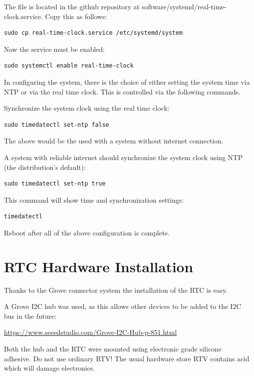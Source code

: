 The file is located in the github repository at software/systemd/real-time-clock.service.
Copy this as follows:

\begin{verbatim}
sudo cp real-time-clock.service /etc/systemd/system
\end{verbatim}

Now the service must be enabled:

\begin{verbatim}
sudo systemctl enable real-time-clock
\end{verbatim}

In configuring the system, there is the choice of either setting the system time via NTP or via the real time clock.  This is controlled via the following commands.

Synchronize the system clock using the real time clock:

\begin{verbatim}
sudo timedatectl set-ntp false
\end{verbatim}

The above would be the used with a system without internet connection.

A system with reliable internet should synchronize the system clock using NTP (the distribution's default):

\begin{verbatim}
sudo timedatectl set-ntp true
\end{verbatim}

This command will show time and synchronization settings:

\begin{verbatim}
timedatectl
\end{verbatim}

Reboot after all of the above configuration is complete.

\section{RTC Hardware Installation}

Thanks to the Grove connector system the installation of the RTC is easy.

A Grove I2C hub was used, as this allows other devices to be added to the I2C bus in the future:

\url{https://www.seeedstudio.com/Grove-I2C-Hub-p-851.html}

Both the hub and the RTC were mounted using electronic grade silicone adhesive.  Do not use ordinary RTV!  The usual hardware store RTV contains acid which will damage electronics.

